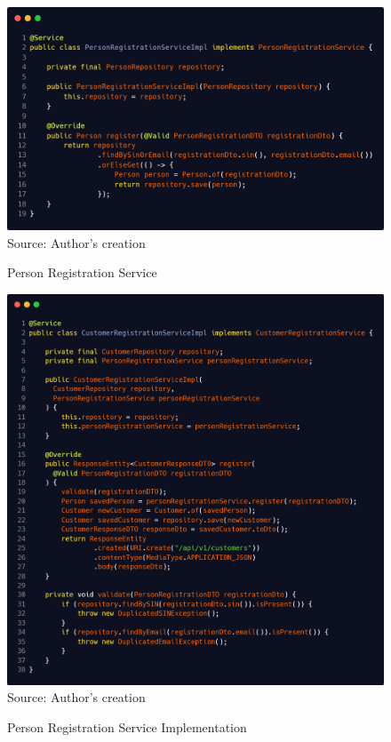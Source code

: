 \begin{figure}[H]
    \centering
    \caption{Person Registration Service}
     \includegraphics[width=1\linewidth]{figures/http/person_registration_service.png}
    \label{fig:person_registration_service}
    \footnotesize Source: Author's creation
\end{figure}

\begin{figure}[H]
    \centering
    \caption{Person Registration Service Implementation}
    \includegraphics[width=0.87\linewidth]{figures/http/customer_registration_service_impl.png}
    \label{fig:person_registration_service_impl}
    \\ \footnotesize Source: Author's creation
\end{figure}

